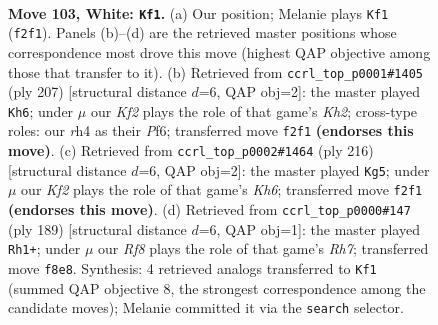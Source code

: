 \documentclass[11pt]{article}
\begin{document}
\begin{figure}[p]\centering
\begin{subfigure}{0.46\textwidth}\centering
\resizebox{\linewidth}{!}{%
\newchessgame
\chessboard[
  setfen={5R2/8/4k3/8/7r/r7/5K2/8 w - - 16 103},
  showmover=false,
  pgfstyle=straightmove, color=movearrow, markmove={f2-f1}
]}
\caption{}
\end{subfigure}\hfill
\begin{subfigure}{0.46\textwidth}\centering
\resizebox{\linewidth}{!}{%
\newchessgame
\chessboard[
  setfen={8/7k/5p2/5P2/7r/5K2/8/6R1 b - - 21 104},
  showmover=false,
  pgfstyle=straightmove, color=movearrow, markmove={h7-h6}
]}
\caption{}
\end{subfigure}
\\[4pt]
\begin{subfigure}{0.46\textwidth}\centering
\resizebox{\linewidth}{!}{%
\newchessgame
\chessboard[
  setfen={8/r7/5N1K/5R2/8/8/6k1/2r5 w - - 58 109},
  showmover=false,
  pgfstyle=straightmove, color=movearrow, markmove={h6-g5}
]}
\caption{}
\end{subfigure}\hfill
\begin{subfigure}{0.46\textwidth}\centering
\resizebox{\linewidth}{!}{%
\newchessgame
\chessboard[
  setfen={1k6/8/8/8/8/2R5/7r/1K6 b - - 21 95},
  showmover=false,
  pgfstyle=straightmove, color=movearrow, markmove={h2-h1}
]}
\caption{}
\end{subfigure}
\caption{\textbf{Move 103, White: \texttt{Kf1}.} (a) Our position; Melanie plays \texttt{Kf1} (\texttt{f2f1}). Panels (b)--(d) are the retrieved master positions whose correspondence most drove this move (highest QAP objective among those that transfer to it). (b) Retrieved from \texttt{ccrl\_top\_p0001\#1405} (ply 207) [structural distance $d$=6, QAP obj=2]: the master played \texttt{Kh6}; under $\mu$ our \emph{Kf2} plays the role of that game's \emph{Kh2}; cross-type roles: our \emph{r}h4 as their \emph{P}f6; transferred move \texttt{f2f1} \textbf{(endorses this move)}. (c) Retrieved from \texttt{ccrl\_top\_p0002\#1464} (ply 216) [structural distance $d$=6, QAP obj=2]: the master played \texttt{Kg5}; under $\mu$ our \emph{Kf2} plays the role of that game's \emph{Kh6}; transferred move \texttt{f2f1} \textbf{(endorses this move)}. (d) Retrieved from \texttt{ccrl\_top\_p0000\#147} (ply 189) [structural distance $d$=6, QAP obj=1]: the master played \texttt{Rh1+}; under $\mu$ our \emph{Rf8} plays the role of that game's \emph{Rh7}; transferred move \texttt{f8e8}. Synthesis: 4 retrieved analogs transferred to \texttt{Kf1} (summed QAP objective 8, the strongest correspondence among the candidate moves); Melanie committed it via the \texttt{search} selector.}
\label{fig:thought-m204}
\end{figure}
\end{document}
